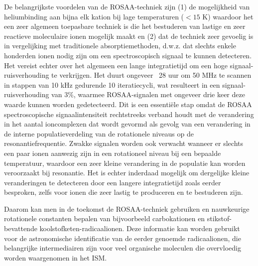{De belangrijkste voordelen van de ROSAA-techniek zijn (1) de mogelijkheid van heliumbinding aan bijna elk kation bij lage temperaturen ($<15$ K) waardoor het een zeer algemeen toepasbare techniek is die het bestuderen van lastige en zeer reactieve moleculaire ionen mogelijk maakt en (2) dat de techniek zeer gevoelig is in vergelijking met traditionele absorptiemethoden, d.w.z. dat slechts enkele honderden ionen nodig zijn om een spectroscopisch signaal te kunnen detecteren. Het vereist echter over het algemeen een lange integratietijd om een hoge signaal-ruisverhouding te verkrijgen. Het duurt ongeveer ~28 uur om 50 MHz te scannen in stappen van 10 kHz gedurende 10 iteratiecycli, wat resulteert in een signaal-ruisverhouding van $3\%$, waarmee ROSAA-signalen met ongeveer drie keer deze waarde kunnen worden gedetecteerd. Dit is een essentiële stap omdat de ROSAA spectroscopische signaalintensiteit rechtstreeks verband houdt met de verandering in het aantal ioncomplexen dat wordt gevormd als gevolg van een verandering in de interne populatieverdeling van de rotationele niveaus op de resonantiefrequentie. Zwakke signalen worden ook verwacht wanneer er slechts een paar ionen aanwezig zijn in een rotationeel niveau bij een bepaalde temperatuur, waardoor een zeer kleine verandering in de populatie kan worden veroorzaakt bij resonantie. Het is echter inderdaad mogelijk om dergelijke kleine veranderingen te detecteren door een langere integratietijd zoals eerder besproken, zelfs voor ionen die zeer lastig te produceren en te bestuderen zijn.

Daarom kan men in de toekomst de ROSAA-techniek gebruiken en nauwkeurige rotationele constanten bepalen van bijvoorbeeld carbokationen en stikstof-bevattende koolstofketen-radicaalionen. Deze informatie kan worden gebruikt voor de astronomische identificatie van de eerder genoemde radicaalionen, die belangrijke intermediairen zijn voor veel organische moleculen die overvloedig worden waargenomen in het ISM.

}